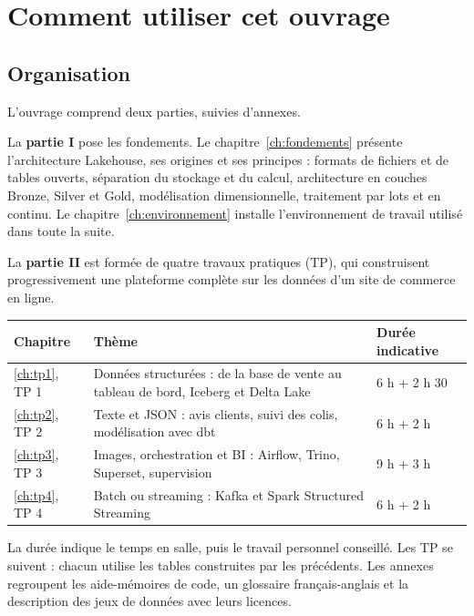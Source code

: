 \chapter*{Comment utiliser cet ouvrage}

\section*{Organisation}

L'ouvrage comprend deux parties, suivies d'annexes.

La \textbf{partie I} pose les fondements. Le chapitre~\ref{ch:fondements} présente l'architecture
Lakehouse, ses origines et ses principes : formats de fichiers et de tables ouverts, séparation du
stockage et du calcul, architecture en couches Bronze, Silver et Gold, modélisation dimensionnelle,
traitement par lots et en continu. Le chapitre~\ref{ch:environnement} installe l'environnement de
travail utilisé dans toute la suite.

La \textbf{partie II} est formée de quatre travaux pratiques (TP), qui construisent progressivement
une plateforme complète sur les données d'un site de commerce en ligne.

\begin{center}
\small
\renewcommand{\arraystretch}{1.3}
\begin{tabularx}{\textwidth}{@{}l X l@{}}
\toprule
\textbf{Chapitre} & \textbf{Thème} & \textbf{Durée indicative} \\
\midrule
\ref{ch:tp1}, TP 1 & Données structurées : de la base de vente au tableau de bord, Iceberg et Delta Lake & 6 h + 2 h 30 \\
\ref{ch:tp2}, TP 2 & Texte et JSON : avis clients, suivi des colis, modélisation avec dbt & 6 h + 2 h \\
\ref{ch:tp3}, TP 3 & Images, orchestration et BI : Airflow, Trino, Superset, supervision & 9 h + 3 h \\
\ref{ch:tp4}, TP 4 & Batch ou streaming : Kafka et Spark Structured Streaming & 6 h + 2 h \\
\bottomrule
\end{tabularx}
\end{center}

La durée indique le temps en salle, puis le travail personnel conseillé. Les TP se suivent : chacun
utilise les tables construites par les précédents. Les annexes regroupent les aide-mémoires de code,
un glossaire français-anglais et la description des jeux de données avec leurs licences.

